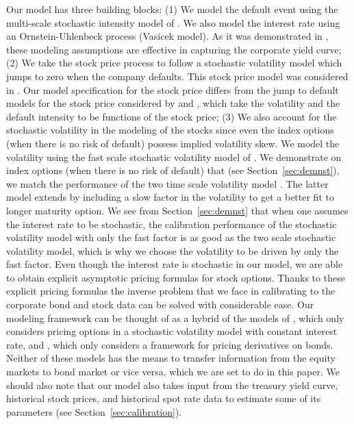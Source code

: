 \documentclass[11pt]{article}
\numberwithin{equation}{section}
\begin{document}
Our model has three building blocks: (1) We model the default event using the multi-scale stochastic intensity model of \cite{papa}. We also model the interest rate using an Ornstein-Uhlenbeck process (Vasicek model). As it was demonstrated in \cite{papa}, these modeling assumptions are effective in capturing the corporate yield curve; (2) We take the stock price process to follow a stochastic volatility model which jumps to zero when the company defaults. This stock price model was considered in \cite{bayraktar2008}. Our model specification for the stock price differs from the jump to default models for the stock price considered by \cite{carr-linetsky} and \cite{Linetsky}, which take the volatility and the default intensity to be functions of the stock price; (3) We also account for the stochastic volatility in the modeling of the stocks since even the index options (when there is no risk of default) possess implied volatility skew.
We model the volatility using the fast scale stochastic volatility model of \cite{sircar}. We demonstrate on index options (when there is no risk of default) that (see Section~\ref{sec:demnst}), we match the performance of  the two time scale volatility model \cite{ronnie-timescale}.  
The latter model extends \cite{sircar} by including a slow factor in the volatility to get a better fit to longer maturity option. We see from Section~\ref{sec:demnst} that
when one assumes the interest rate to be stochastic, the calibration performance of the stochastic volatility model with only the fast factor is as good as the two scale stochastic volatility model, which is why we choose the volatility to be driven by only the fast factor.  Even though the interest rate is stochastic in our model, we are able to obtain explicit asymptotic pricing formulas for stock options. Thanks to these explicit pricing formulas the inverse problem that we face in calibrating to the corporate bond and stock data can be solved with considerable ease.  Our modeling framework can be thought of as a hybrid of the models of \cite{sircar}, which only considers pricing options in a stochastic volatility model with constant interest rate, and \cite{papa}, which only considers a framework for pricing derivatives on bonds. Neither of these models has the means to transfer information from the equity markets to bond market or vice versa, which we are set to do in this paper. We should also note that our model also takes input from the treasury yield curve, historical stock prices, and historical spot rate data to estimate some of its parameters (see Section~\ref{sec:calibration}). 
\end{document}
